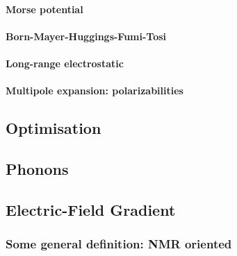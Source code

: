 \documentclass[a4paper,8pt]{article}
\begin{document}
\paragraph{Morse potential\label{sec:morse}}
\paragraph{Born-Mayer-Huggings-Fumi-Tosi\label{sec:BMHFT}}
\paragraph{Long-range electrostatic\label{sec:COUL}}
\paragraph{Multipole expansion: polarizabilities \label{sec:pola}}


\subsection{Optimisation\label{sec:OPT}}

\subsection{Phonons\label{sec:VIB}}

\subsection{Electric-Field Gradient\label{sec:EFG}}

\subsubsection{Some general definition: NMR oriented}
\end{document}
